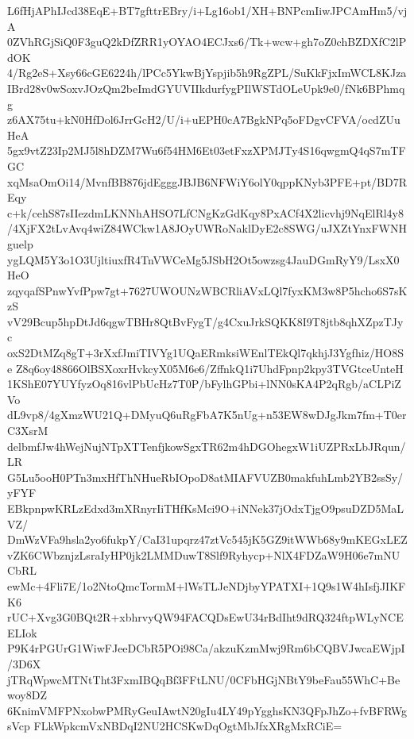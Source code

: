 L6fHjAPhIJcd38EqE+BT7gfttrEBry/i+Lg16ob1/XH+BNPcmIiwJPCAmHm5/vjA
0ZVhRGjSiQ0F3guQ2kDfZRR1yOYAO4ECJxs6/Tk+wcw+gh7oZ0chBZDXfC2lPdOK
4/Rg2eS+Xsy66cGE6224h/lPCc5YkwBjYspjib5h9RgZPL/SuKkFjxImWCL8KJza
IBrd28v0wSoxvJOzQm2beImdGYUVIIkdurfygPIlWSTdOLeUpk9e0/fNk6BPhmqg
z6AX75tu+kN0HfDol6JrrGcH2/U/i+uEPH0cA7BgkNPq5oFDgvCFVA/ocdZUuHeA
5gx9vtZ23Ip2MJ5l8hDZM7Wu6f54HM6Et03etFxzXPMJTy4S16qwgmQ4qS7mTFGC
xqMsaOmOi14/MvnfBB876jdEgggJBJB6NFWiY6olY0qppKNyb3PFE+pt/BD7REqy
c+k/cehS87sIIezdmLKNNhAHSO7LfCNgKzGdKqy8PxACf4X2licvhj9NqElRl4y8
/4XjFX2tLvAvq4wiZ84WCkw1A8JOyUWRoNaklDyE2c8SWG/uJXZtYnxFWNHguelp
ygLQM5Y3o1O3UjltiuxfR4TnVWCeMg5JSbH2Ot5owzsg4JauDGmRyY9/LsxX0HeO
zqyqafSPnwYvfPpw7gt+7627UWOUNzWBCRliAVxLQl7fyxKM3w8P5hcho6S7sKzS
vV29Bcup5hpDtJd6qgwTBHr8QtBvFygT/g4CxuJrkSQKK8I9T8jtb8qhXZpzTJyc
oxS2DtMZq8gT+3rXxfJmiTIVYg1UQaERmksiWEnlTEkQl7qkhjJ3Ygfhiz/HO8Se
Z8q6oy48866OlBSXoxrHvkcyX05M6e6/ZffnkQ1i7UhdFpnp2kpy3TVGtceUnteH
1KShE07YUYfyzOq816vlPbUcHz7T0P/bFylhGPbi+lNN0sKA4P2qRgb/aCLPiZVo
dL9vp8/4gXmzWU21Q+DMyuQ6uRgFbA7K5nUg+n53EW8wDJgJkm7fm+T0erC3XsrM
delbmfJw4hWejNujNTpXTTenfjkowSgxTR62m4hDGOhegxW1iUZPRxLbJRqun/LR
G5Lu5ooH0PTn3mxHfThNHueRbIOpoD8atMIAFVUZB0makfuhLmb2YB2ssSy/yFYF
EBkpnpwKRLzEdxd3mXRnyrIiTHfKsMci9O+iNNek37jOdxTjgO9psuDZD5MaLVZ/
DmWzVFa9hsla2yo6fukpY/CaI31upqrz47ztVc545jK5GZ9itWWb68y9mKEGxLEZ
vZK6CWbznjzLsraIyHP0jk2LMMDuwT8Slf9Ryhycp+NlX4FDZaW9H06e7mNUCbRL
ewMc+4Fli7E/1o2NtoQmcTormM+lWsTLJeNDjbyYPATXI+1Q9s1W4hIsfjJIKFK6
rUC+Xvg3G0BQt2R+xbhrvyQW94FACQDsEwU34rBdIht9dRQ324ftpWLyNCEELIok
P9K4rPGUrG1WiwFJeeDCbR5POi98Ca/akzuKzmMwj9Rm6bCQBVJwcaEWjpI/3D6X
jTRqWpwcMTNtTht3FxmIBQqBf3FFtLNU/0CFbHGjNBtY9beFau55WhC+Bewoy8DZ
6KnimVMFPNxobwPMRyGeuIAwtN20gIu4LY49pYgghsKN3QFpJhZo+fvBFRWgsVcp
FLkWpkcmVxNBDqI2NU2HCSKwDqOgtMbJfxXRgMxRCiE=
